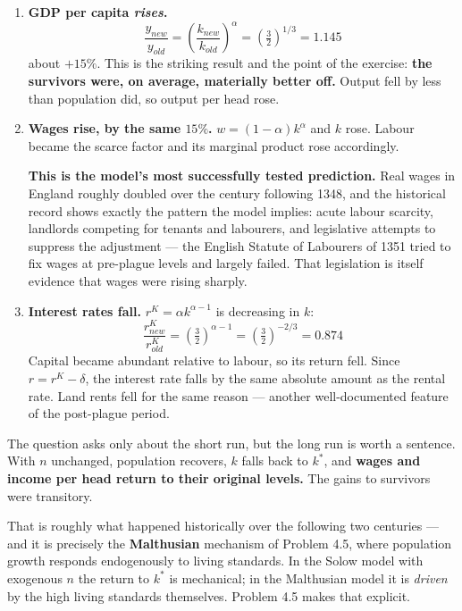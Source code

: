 \documentclass[12pt, letterpaper]{article}
\newcommand{\stst}{^{\ast}}
\begin{document}
\begin{tcolorbox}[evenbox,title={Problem 4.2 \quad The Black Death}]
\begin{enumerate}
\item \textbf{GDP per capita \emph{rises}.}
$$\frac{y_{new}}{y_{old}} = \left(\frac{k_{new}}{k_{old}}\right)^{\alpha}
= \left(\tfrac{3}{2}\right)^{1/3} = 1.145$$
about $+15\%$. This is the striking result and the point of the exercise: \textbf{the
survivors were, on average, materially better off.} Output fell by less than population did,
so output per head rose.

\item \textbf{Wages rise, by the same $15\%$.} $w = (1-\alpha)k^\alpha$ and $k$ rose. Labour
became the scarce factor and its marginal product rose accordingly.

\textbf{This is the model's most successfully tested prediction.} Real wages in England
roughly doubled over the century following 1348, and the historical record shows exactly the
pattern the model implies: acute labour scarcity, landlords competing for tenants and
labourers, and legislative attempts to suppress the adjustment --- the English Statute of
Labourers of 1351 tried to fix wages at pre-plague levels and largely failed. That legislation
is itself evidence that wages were rising sharply.

\item \textbf{Interest rates fall.} $r^K = \alpha k^{\alpha - 1}$ is decreasing in $k$:
$$\frac{r^K_{new}}{r^K_{old}} = \left(\tfrac{3}{2}\right)^{\alpha-1}
= \left(\tfrac{3}{2}\right)^{-2/3} = 0.874$$
Capital became abundant relative to labour, so its return fell. Since $r = r^K - \delta$, the
interest rate falls by the same absolute amount as the rental rate. Land rents fell for the
same reason --- another well-documented feature of the post-plague period.

\end{enumerate}

\begin{tcolorbox}[theorybox,title={The long run --- and why history did not stay there}]
The question asks only about the short run, but the long run is worth a sentence. With $n$
unchanged, population recovers, $k$ falls back to $k\stst$, and \textbf{wages and income per
head return to their original levels.} The gains to survivors were transitory.

That is roughly what happened historically over the following two centuries --- and it is
precisely the \textbf{Malthusian} mechanism of Problem 4.5, where population growth responds
endogenously to living standards. In the Solow model with exogenous $n$ the return to
$k\stst$ is mechanical; in the Malthusian model it is \emph{driven} by the high living
standards themselves. Problem 4.5 makes that explicit.
\end{tcolorbox}


\end{tcolorbox}
\end{document}
